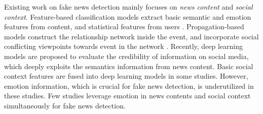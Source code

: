 \documentclass[conference]{IEEEtran}
\begin{document}
	Existing work on fake news detection mainly focuses on {\em news content} and {\em social context}. Feature-based classification models extract basic semantic and emotion features from content, and statistical features from users \cite{castillo2011information}. Propagation-based models construct the relationship network inside the event, and incorporate social conflicting viewpoints towards event in the network \cite{jin2014news,jin2016news}. Recently, deep learning models are proposed to evaluate the credibility of information on social media, which deeply exploits the semantics information from news content\cite{ma2016detecting}. Basic social context features are fused into deep learning models in some studies\cite{guo2018rumor}. However, emotion information, which is crucial for fake news detection, is underutilized in these studies. Few studies leverage emotion in news contents and social context simultaneously for fake news detection.
	
	
\end{document}
